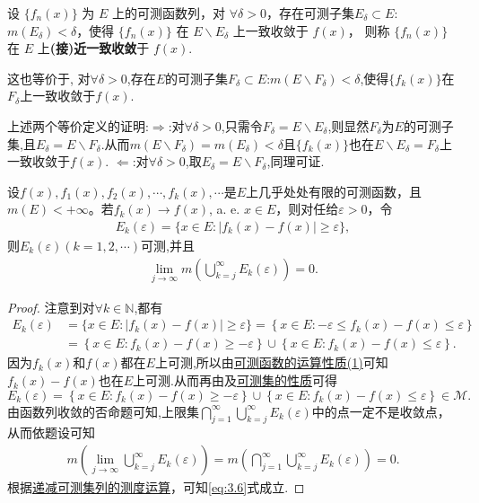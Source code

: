 \documentclass[../../main.tex]{subfiles}
\begin{document}
\begin{definition}[(接)近一致收敛]
设 $\{f_n(x)\}$ 为 $E$ 上的可测函数列，对 $\forall\delta > 0$，存在可测子集$E_\delta\subset E$:$m(E_\delta) < \delta$，使得 $\{f_n(x)\}$ 在 $E\backslash E_\delta$ 上一致收敛于 $f(x)$，
则称 $\{f_n(x)\}$ 在 $E$ 上\textbf{(接)近一致收敛}于 $f(x)$. 

这也等价于,
对$\forall \delta >0$,存在$E$的可测子集$F_\delta\subset E$:$m(E\backslash F_\delta)<\delta$,使得$\{f_k(x)\}$在$F_\delta$上一致收敛于$f(x)$.
\end{definition}
\begin{remark}
上述两个等价定义的证明:$\Rightarrow$:对$\forall \delta >0$,只需令$F_\delta=E\backslash E_\delta$,则显然$F_\delta$为$E$的可测子集,且$E_\delta=E\backslash F_\delta$.从而$m(E\backslash F_\delta)=m(E_\delta)<\delta$且$\{f_k(x)\}$也在$E\backslash E_\delta=F_\delta$上一致收敛于$f(x)$.
$\Leftarrow$:对$\forall \delta >0$,取$E_\delta=E\backslash F_\delta$,同理可证.
\end{remark}

\begin{lemma}\label{lemma:引理3.11}
设$f(x), f_1(x), f_2(x), \cdots, f_k(x), \cdots$是$E$上几乎处处有限的可测函数，且$m(E) < +\infty$。若$f_k(x) \to f(x)$, a. e. $x \in E$，则对任给$\varepsilon > 0$，令
\begin{align*}
E_k(\varepsilon) = \{x \in E: |f_k(x) - f(x)| \geqslant \varepsilon\},
\end{align*}
则$E_k(\varepsilon)(k=1,2,\cdots)$可测,并且
\begin{align}
\lim_{j \to \infty} m\left( \bigcup_{k = j}^{\infty} E_k(\varepsilon) \right) = 0. \label{eq:3.6}
\end{align}
\end{lemma}
\begin{proof}
注意到对$\forall k\in \mathbb{N}$,都有
\begin{align*}
E_k(\varepsilon )&=\{x\in E:|f_k(x)-f(x)|\geqslant \varepsilon \}=\left\{ x\in E:-\varepsilon \leqslant f_k(x)-f(x)\leqslant \varepsilon \right\} 
\\
&=\left\{ x\in E:f_k(x)-f(x)\geqslant -\varepsilon \right\} \cup \left\{ x\in E:f_k(x)-f(x)\leqslant \varepsilon \right\} .
\end{align*}
因为$f_k(x)$和$f(x)$都在$E$上可测,所以由\hyperref[theorem:可测函数的运算性质]{可测函数的运算性质(1)}可知$f_k(x)-f(x)$也在$E$上可测.从而再由及\hyperref[theorem:可测集的性质]{可测集的性质}可得
\[
E_k(\varepsilon)=\left\{ x\in E:f_k(x)-f(x)\geqslant -\varepsilon \right\} \cup \left\{ x\in E:f_k(x)-f(x)\leqslant \varepsilon \right\}\in \mathscr{M}.
\]
由函数列收敛的否命题可知,上限集$\bigcap_{j = 1}^{\infty} \bigcup_{k = j}^{\infty} E_k(\varepsilon)$中的点一定不是收敛点，从而依题设可知
\begin{align*}
m\left( \lim_{j \to \infty}\bigcup_{k = j}^{\infty} E_k(\varepsilon) \right)=m\left( \bigcap_{j = 1}^{\infty} \bigcup_{k = j}^{\infty} E_k(\varepsilon) \right) = 0.
\end{align*}
根据\hyperref[corollary:递减可测集列的测度运算]{递减可测集列的测度运算}，可知\eqref{eq:3.6}式成立.

\end{proof}
\end{document}
